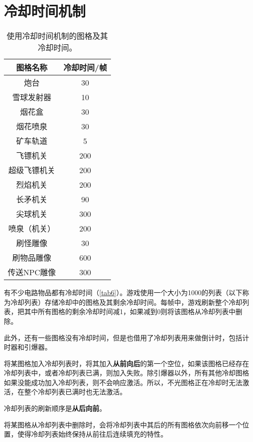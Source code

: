 \chapter{冷却时间机制}\label{app35}
\begin{table}[!ht]
\centering
\begin{tabular}{c|c}
图格名称&冷却时间/帧\\\hline\hline
炮台&30\\\hline
雪球发射器&10\\\hline
烟花盒&30\\\hline
烟花喷泉&30\\\hline
矿车轨道&5\\\hline
飞镖机关&200\\\hline
超级飞镖机关&200\\\hline
烈焰机关&200\\\hline
长矛机关&90\\\hline
尖球机关&300\\\hline
喷泉（机关）&200\\\hline
刷怪雕像&30\\\hline
刷物品雕像&600\\\hline
传送NPC雕像&300\\\hline
\end{tabular}
\caption{使用冷却时间机制的图格及其冷却时间。}\label{tab6}
\end{table}

有不少电路物品都有冷却时间（\autoref{tab6}）。游戏使用一个大小为1000的列表（以下称为冷却列表）存储冷却中的图格及其剩余冷却时间。每帧中，游戏刷新整个冷却列表，把其中所有图格的剩余冷却时间减1，如果减到0则将该图格从冷却列表中删除。

此外，还有一些图格没有冷却时间，但是也借用了冷却列表用来做倒计时，包括计时器和引爆器。

将某图格加入冷却列表时，将其加入\textbf{从前向后}的第一个空位，如果该图格已经存在冷却列表中，或者冷却列表已满，则加入失败。除引爆器以外，所有其他冷却图格如果没能成功加入冷却列表，则不会响应激活。所以，不光图格正在冷却时无法激活，在整个冷却列表已满时也无法激活。

冷却列表的刷新顺序是\textbf{从后向前}。

将某图格从冷却列表中删除时，会将冷却列表中其后的所有图格依次向前移一个位置，使得冷却列表始终保持从前往后连续填充的特性。